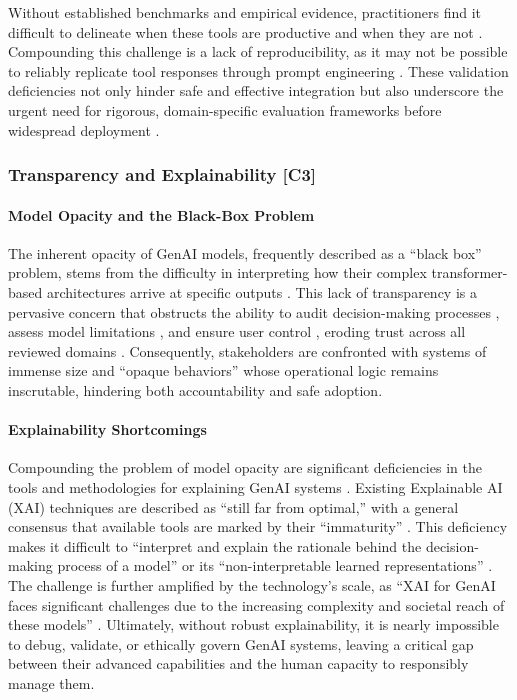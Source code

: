 Without established benchmarks and empirical evidence, practitioners find it difficult to delineate when these tools are productive and when they are not \parencite{R06}. Compounding this challenge is a lack of reproducibility, as it may not be possible to reliably replicate tool responses through prompt engineering \parencite{R06}. These validation deficiencies not only hinder safe and effective integration \parencite{S01, S07} but also underscore the urgent need for rigorous, domain-specific evaluation frameworks before widespread deployment \parencite{S07, S18}.

\subsubsection{Transparency and Explainability [C3]}
\paragraph{Model Opacity and the Black-Box Problem}
The inherent opacity of GenAI models, frequently described as a ``black box'' problem, stems from the difficulty in interpreting how their complex transformer-based architectures arrive at specific outputs \parencite{R02, S09, R10}. This lack of transparency is a pervasive concern that obstructs the ability to audit decision-making processes \parencite{R02, R06}, assess model limitations \parencite{R08, S14}, and ensure user control \parencite{R09}, eroding trust across all reviewed domains \parencite{S08, R08, S14, S16}. Consequently, stakeholders are confronted with systems of immense size and ``opaque behaviors'' \parencite{S09} whose operational logic remains inscrutable, hindering both accountability and safe adoption.

\paragraph{Explainability Shortcomings}
Compounding the problem of model opacity are significant deficiencies in the tools and methodologies for explaining GenAI systems \parencite{S06, S07, S09, S18}. Existing Explainable AI (XAI) techniques are described as \enquote{still far from optimal,} with a general consensus that available tools are marked by their ``immaturity'' \parencite{S18}. This deficiency makes it difficult to \enquote{interpret and explain the rationale behind the decision-making process of a model} \parencite{R02} or its \enquote{non-interpretable learned representations} \parencite{S07}. The challenge is further amplified by the technology's scale, as \enquote{XAI for GenAI faces significant challenges due to the increasing complexity and societal reach of these models} \parencite{S18}. Ultimately, without robust explainability, it is nearly impossible to debug, validate, or ethically govern GenAI systems, leaving a critical gap between their advanced capabilities and the human capacity to responsibly manage them.

